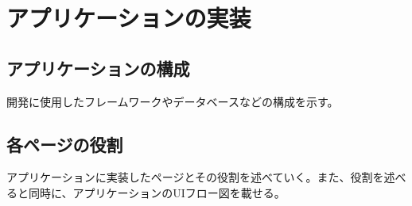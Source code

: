 \documentclass[main]{subfiles}
\begin{document}
\chapter{アプリケーションの実装}
\section{アプリケーションの構成}
開発に使用したフレームワークやデータベースなどの構成を示す。
\section{各ページの役割}
アプリケーションに実装したページとその役割を述べていく。また、役割を述べると同時に、アプリケーションのUIフロー図を載せる。
\end{document}
